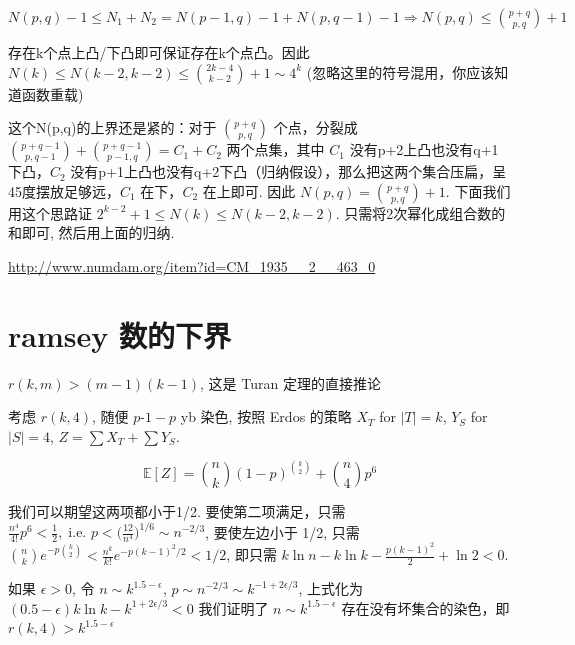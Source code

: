 
$N(p,q)-1\leq N_1+N_2=N(p-1,q)-1+N(p,q-1)-1\Rightarrow N(p,q)\leq{p+q\choose p,q}+1$

存在k个点上凸/下凸即可保证存在k个点凸。因此 $N(k)\leq N(k-2,k-2)\leq{2k-4\choose k-2}+1\sim 4^k$ (忽略这里的符号混用，你应该知道函数重载)

这个N(p,q)的上界还是紧的：对于 ${p+q\choose p,q}$ 个点，分裂成 ${p+q-1\choose p,q-1}+{p+q-1\choose p-1,q}=C_1+C_2$ 两个点集，其中 $C_1$ 没有p+2上凸也没有q+1下凸，$C_2$ 没有p+1上凸也没有q+2下凸（归纳假设），那么把这两个集合压扁，呈45度摆放足够远，$C_1$ 在下，$C_2$ 在上即可. 因此 $N(p,q)={p+q\choose p,q}+1$. 下面我们用这个思路证 $2^{k-2}+1\leq N(k)\leq N(k-2,k-2)$. 只需将2次幂化成组合数的和即可, 然后用上面的归纳.



\url{http://www.numdam.org/item?id=CM_1935__2__463_0}

\section{ramsey 数的下界}

$r(k,m)> (m-1)(k-1)$, 这是 Turan 定理的直接推论

考虑 $r(k,4)$, 随便 $p$-$1-p$ yb 染色, 按照 Erdos 的策略 $X_T$ for $|T|=k$, $Y_S$ for $|S|=4$, $Z=\sum X_T+\sum Y_S$.

\[
\mathbb{E}[Z]={n\choose k}(1-p)^{{k\choose 2}}+{n\choose 4}p^{6}
\]

我们可以期望这两项都小于1/2. 要使第二项满足，只需 $\frac{n^4}{4!}p^6<\frac{1}{2},\;\text{i.e. }p<\Big(\frac{12}{n^4}\Big)^{1/6}\sim n^{-2/3}$, 要使左边小于 1/2, 只需 ${n\choose k}e^{-p{k\choose 2}}<\frac{n^k}{k!}e^{-p(k-1)^2/2}<1/2$, 即只需 $k\ln n-k\ln k-\frac{p(k-1)^2}{2}+\ln 2<0$.

如果 $\epsilon>0$, 令 $n\sim k^{1.5-\epsilon}$, $p\sim n^{-2/3}\sim k^{-1+2\epsilon/3}$, 上式化为 $(0.5-\epsilon)k\ln k-k^{1+2\epsilon/3}<0$ 我们证明了 $n\sim k^{1.5-\epsilon}$ 存在没有坏集合的染色，即 $r(k,4)>k^{1.5-\epsilon}$
